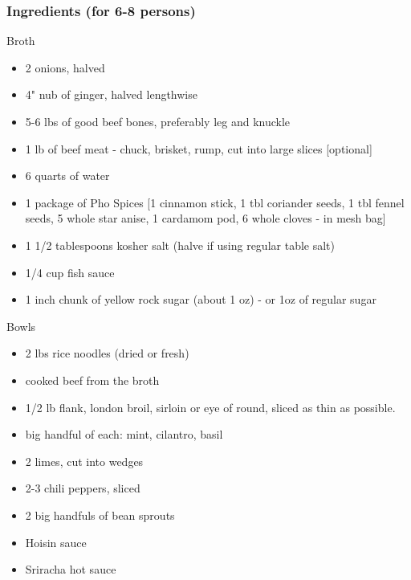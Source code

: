 \subsubsection*{Ingredients (for 6-8 persons)}
Broth
\begin{itemize}
\item[] 2 onions, halved
\item[] 4" nub of ginger, halved lengthwise
\item[] 5-6 lbs of good beef bones, preferably leg and knuckle
\item[] 1 lb of beef meat - chuck, brisket, rump, cut into large slices [optional]
\item[] 6 quarts of water
\item[] 1 package of Pho Spices [1 cinnamon stick, 1 tbl coriander seeds, 1 tbl fennel seeds, 5 whole star anise, 1 cardamom pod, 6 whole cloves - in mesh bag]
\item[] 1 1/2 tablespoons kosher salt (halve if using regular table salt)
\item[] 1/4 cup fish sauce
\item[] 1 inch chunk of yellow rock sugar (about 1 oz) - or 1oz of regular sugar
\end{itemize}
Bowls
\begin{itemize}
\item[] 2 lbs rice noodles (dried or fresh)
\item[] cooked beef from the broth
\item[] 1/2 lb flank, london broil, sirloin or eye of round, sliced as thin as possible.
\item[] big handful of each: mint, cilantro, basil
\item[] 2 limes, cut into wedges
\item[] 2-3 chili peppers, sliced
\item[] 2 big handfuls of bean sprouts
\item[] Hoisin sauce
\item[] Sriracha hot sauce
\end{itemize}
